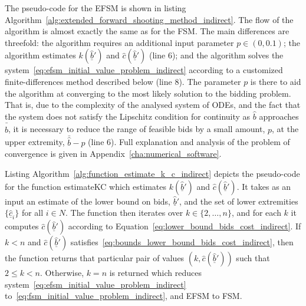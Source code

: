 The pseudo-code for the EFSM is shown in listing Algorithm~\ref{alg:extended_forward_shooting_method_indirect}. The flow of the algorithm is almost exactly the same as for the FSM. The main differences are threefold: the algorithm requires an additional input parameter $p\in(0, 0.1)$; the algorithm estimates $k(\underline{\hat{b}}')$ and $\hat{c}(\underline{\hat{b}}')$ (line 6); and the algorithm solves the system~\eqref{eq:efsm_initial_value_problem_indirect} according to a customized finite-differences method described below (line 8). The parameter $p$ is there to aid the algorithm at converging to the most likely solution to the bidding problem. That is, due to the complexity of the analysed system of ODEs, and the fact that the system does not satisfy the Lipschitz condition for continuity as $\hat{b}$ approaches $\bar{\hat{b}}$, it is necessary to reduce the range of feasible bids by a small amount, $p$, at the upper extremity, $\bar{\hat{b}} - p$ (line 6). Full explanation and analysis of the problem of convergence is given in Appendix~\ref{cha:numerical_software}.

Listing Algorithm~\ref{alg:function_estimate_k_c_indirect} depicts the pseudo-code for the function estimateKC which estimates $k(\underline{\hat{b}}')$ and $\hat{c}(\underline{\hat{b}}')$. It takes as an input an estimate of the lower bound on bids, $\underline{\hat{b}}'$, and the set of lower extremities $\{\underline{\hat{c}}_i\}$ for all $i\in N$. The function then iterates over $k\in\{2,\ldots,n\}$, and for each $k$ it computes $\hat{c}(\underline{\hat{b}}')$ according to Equation~\eqref{eq:lower_bound_bids_cost_indirect}. If $k<n$ and $\hat{c}(\underline{\hat{b}}')$ satisfies~\eqref{eq:bounds_lower_bound_bids_cost_indirect}, then the function returns that particular pair of values $(k, \hat{c}(\underline{\hat{b}}'))$ such that $2\leq k < n$. Otherwise, $k=n$ is returned which reduces system~\eqref{eq:efsm_initial_value_problem_indirect} to~\eqref{eq:fsm_initial_value_problem_indirect}, and EFSM to FSM.

